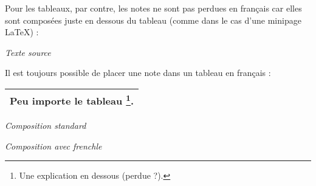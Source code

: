\documentclass[a4paper,12pt,openright]{article}
\begin{document}
Pour les tableaux, par contre, les notes ne sont pas perdues en français car
elles sont composées juste en dessous du tableau
 (comme dans le cas d’une minipage
\LaTeX) :
\begin{center} %
\textit{Texte source}\\[1ex]

\begin{boxedverbatim}
\begin{table} 
Il est toujours possible de placer une
note dans un tableau en français : 
\bigskip 
\begin{tabular}{|c|} 
  \hline 
   Peu importe le tableau 
   \footnote{Une explication en 
             dessous (perdue ?).}. \\
   \hline 
 \end{tabular} 
 \end{table}
\end{boxedverbatim}

\setcounter{mpfootnote}{1} %
\renewcommand{\thempfootnote}{\alph{mpfootnote}}
\parbox[t]{70mm}{
\begin{center}
\textit{Composition standard}
{\nofrenchtypography\nofrenchlayout
{}}
\end{center}
}%
\parbox[t]{70mm}{
\begin{center}
\textit{Composition avec frenchle}

\end{center}
}
%
\end{center}
\end{document}

